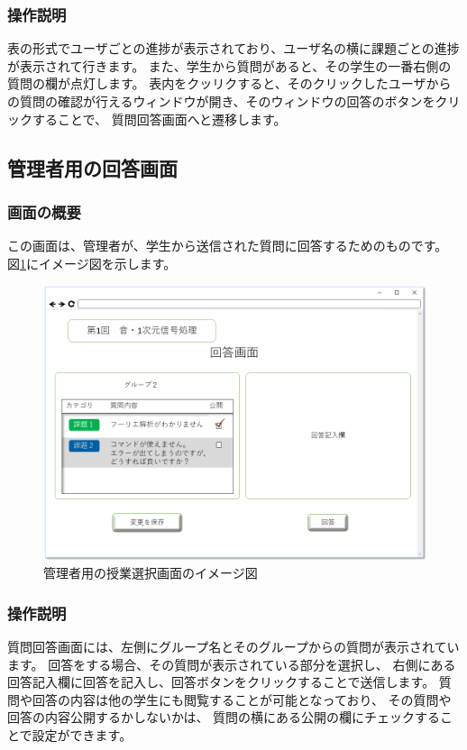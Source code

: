 \subsubsection{操作説明}
表の形式でユーザごとの進捗が表示されており、ユーザ名の横に課題ごとの進捗が表示されて行きます。
また、学生から質問があると、その学生の一番右側の質問の欄が点灯します。
表内をクッリクすると、そのクリックしたユーザからの質問の確認が行えるウィンドウが開き、そのウィンドウの回答のボタンをクリックすることで、
質問回答画面へと遷移します。

\newpage

\subsection{管理者用の回答画面}
\subsubsection{画面の概要}
この画面は、管理者が、学生から送信された質問に回答するためのものです。
図\ref{fig:sc_answer}にイメージ図を示します。

\begin{figure}[htbp]
\begin{center}
  \includegraphics[width=1\linewidth,clip]{./img/sc_answer.png}
  \caption{管理者用の授業選択画面のイメージ図}\label{fig:sc_answer}
\end{center}
\end{figure}

\subsubsection{操作説明}
質問回答画面には、左側にグループ名とそのグループからの質問が表示されています。
回答をする場合、その質問が表示されている部分を選択し、
右側にある回答記入欄に回答を記入し、回答ボタンをクリックすることで送信します。
質問や回答の内容は他の学生にも閲覧することが可能となっており、
その質問や回答の内容公開するかしないかは、
質問の横にある公開の欄にチェックすることで設定ができます。

